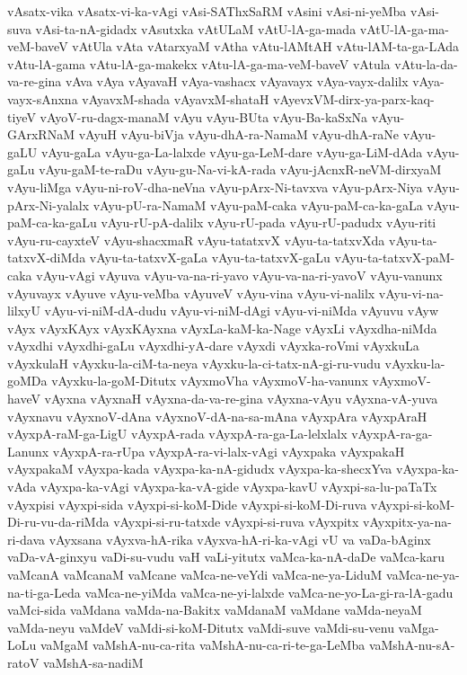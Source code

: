 {vAsatx-vika
vAsatx-vi-ka-vAgi
vAsi-SAThxSaRM
vAsini
vAsi-ni-yeMba
vAsi-suva
vAsi-ta-nA-gidadx
vAsutxka
vAtULaM
vAtU-lA-ga-mada
vAtU-lA-ga-ma-veM-baveV
vAtUla
vAta
vAtarxyaM
vAtha
vAtu-lAMtAH
vAtu-lAM-ta-ga-LAda
vAtu-lA-gama
vAtu-lA-ga-makekx
vAtu-lA-ga-ma-veM-baveV
vAtula
vAtu-la-da-va-re-gina
vAva
vAya
vAyavaH
vAya-vashacx
vAyavayx
vAya-vayx-dalilx
vAya-vayx-sAnxna
vAyavxM-shada
vAyavxM-shataH
vAyevxVM-dirx-ya-parx-kaq-tiyeV
vAyoV-ru-dagx-manaM
vAyu
vAyu-BUta
vAyu-Ba-kaSxNa
vAyu-GArxRNaM
vAyuH
vAyu-biVja
vAyu-dhA-ra-NamaM
vAyu-dhA-raNe
vAyu-gaLU
vAyu-gaLa
vAyu-ga-La-lalxde
vAyu-ga-LeM-dare
vAyu-ga-LiM-dAda
vAyu-gaLu
vAyu-gaM-te-raDu
vAyu-gu-Na-vi-kA-rada
vAyu-jAcnxR-neVM-dirxyaM
vAyu-liMga
vAyu-ni-roV-dha-neVna
vAyu-pArx-Ni-tavxva
vAyu-pArx-Niya
vAyu-pArx-Ni-yalalx
vAyu-pU-ra-NamaM
vAyu-paM-caka
vAyu-paM-ca-ka-gaLa
vAyu-paM-ca-ka-gaLu
vAyu-rU-pA-dalilx
vAyu-rU-pada
vAyu-rU-padudx
vAyu-riti
vAyu-ru-cayxteV
vAyu-shacxmaR
vAyu-tatatxvX
vAyu-ta-tatxvXda
vAyu-ta-tatxvX-diMda
vAyu-ta-tatxvX-gaLa
vAyu-ta-tatxvX-gaLu
vAyu-ta-tatxvX-paM-caka
vAyu-vAgi
vAyuva
vAyu-va-na-ri-yavo
vAyu-va-na-ri-yavoV
vAyu-vanunx
vAyuvayx
vAyuve
vAyu-veMba
vAyuveV
vAyu-vina
vAyu-vi-nalilx
vAyu-vi-na-lilxyU
vAyu-vi-niM-dA-dudu
vAyu-vi-niM-dAgi
vAyu-vi-niMda
vAyuvu
vAyw
vAyx
vAyxKAyx
vAyxKAyxna
vAyxLa-kaM-ka-Nage
vAyxLi
vAyxdha-niMda
vAyxdhi
vAyxdhi-gaLu
vAyxdhi-yA-dare
vAyxdi
vAyxka-roVmi
vAyxkuLa
vAyxkulaH
vAyxku-la-ciM-ta-neya
vAyxku-la-ci-tatx-nA-gi-ru-vudu
vAyxku-la-goMDa
vAyxku-la-goM-Ditutx
vAyxmoVha
vAyxmoV-ha-vanunx
vAyxmoV-haveV
vAyxna
vAyxnaH
vAyxna-da-va-re-gina
vAyxna-vAyu
vAyxna-vA-yuva
vAyxnavu
vAyxnoV-dAna
vAyxnoV-dA-na-sa-mAna
vAyxpAra
vAyxpAraH
vAyxpA-raM-ga-LigU
vAyxpA-rada
vAyxpA-ra-ga-La-lelxlalx
vAyxpA-ra-ga-Lanunx
vAyxpA-ra-rUpa
vAyxpA-ra-vi-lalx-vAgi
vAyxpaka
vAyxpakaH
vAyxpakaM
vAyxpa-kada
vAyxpa-ka-nA-gidudx
vAyxpa-ka-shecxYva
vAyxpa-ka-vAda
vAyxpa-ka-vAgi
vAyxpa-ka-vA-gide
vAyxpa-kavU
vAyxpi-sa-lu-paTaTx
vAyxpisi
vAyxpi-sida
vAyxpi-si-koM-Dide
vAyxpi-si-koM-Di-ruva
vAyxpi-si-koM-Di-ru-vu-da-riMda
vAyxpi-si-ru-tatxde
vAyxpi-si-ruva
vAyxpitx
vAyxpitx-ya-na-ri-dava
vAyxsana
vAyxva-hA-rika
vAyxva-hA-ri-ka-vAgi
vU
va
vaDa-bAginx
vaDa-vA-ginxyu
vaDi-su-vudu
vaH
vaLi-yitutx
vaMca-ka-nA-daDe
vaMca-karu
vaMcanA
vaMcanaM
vaMcane
vaMca-ne-veYdi
vaMca-ne-ya-LiduM
vaMca-ne-ya-na-ti-ga-Leda
vaMca-ne-yiMda
vaMca-ne-yi-lalxde
vaMca-ne-yo-La-gi-ra-lA-gadu
vaMci-sida
vaMdana
vaMda-na-Bakitx
vaMdanaM
vaMdane
vaMda-neyaM
vaMda-neyu
vaMdeV
vaMdi-si-koM-Ditutx
vaMdi-suve
vaMdi-su-venu
vaMga-LoLu
vaMgaM
vaMshA-nu-ca-rita
vaMshA-nu-ca-ri-te-ga-LeMba
vaMshA-nu-sA-ratoV
vaMshA-sa-nadiM
}
